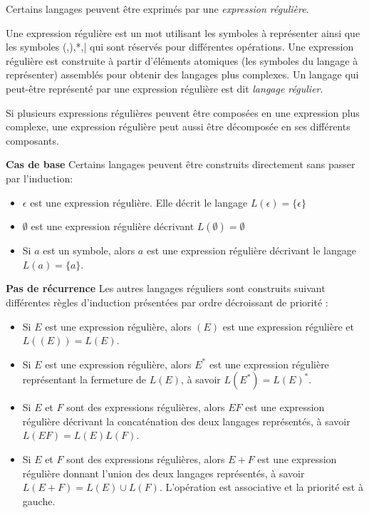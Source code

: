 Certains langages peuvent être exprimés par une \emph{expression régulière}.

Une expression régulière est un mot utilisant les symboles à représenter ainsi que les symboles (,),*,| qui sont réservés pour différentes opérations. Une expression régulière est construite à partir d'éléments atomiques (les symboles du langage à représenter) assemblés pour obtenir des langages plus complexes. Un langage qui peut-être représenté par une expression régulière est dit \emph{langage régulier}.

Si plusieurs expressions régulières peuvent être composées en une expression plus complexe, une expression régulière peut aussi être décomposée en ses différents composants.

\textbf{Cas de base}
Certains langages peuvent être construits directement sans passer par l'induction:

\begin{itemize}
	\item $\epsilon$ est une expression régulière. Elle décrit le langage $L(\epsilon)=\{\epsilon\}$
	\item $\emptyset$ est une expression régulière décrivant $L(\emptyset)=\emptyset$
	\item Si $a$ est un symbole, alors $a$ est une expression régulière décrivant le langage $L(a) = \{a\}$.
\end{itemize}


\textbf{Pas de récurrence}
Les autres langages réguliers sont construits suivant différentes règles d'induction présentées par ordre décroissant de priorité :

\begin{itemize}
	\item Si $E$ est une expression régulière, alors $(E)$ est une expression régulière et $L((E)) = L(E)$.
	\item Si $E$ est une expression régulière, alors $E^*$ est une expression régulière représentant la fermeture de $L(E)$, à savoir $L(E^*) = L(E)^*$.
	\item Si $E$ et $F$ sont des expressions régulières, alors $EF$ est une expression régulière décrivant la concaténation des deux langages représentés, à savoir $L(EF)=L(E)L(F)$.
	\item Si $E$ et $F$ sont des expressions régulières, alors $E+F$ est une expression régulière donnant l'union des deux langages représentés, à savoir $L(E+F)=L(E)\cup L(F)$. L'opération est associative et la priorité est à gauche.
\end{itemize}

